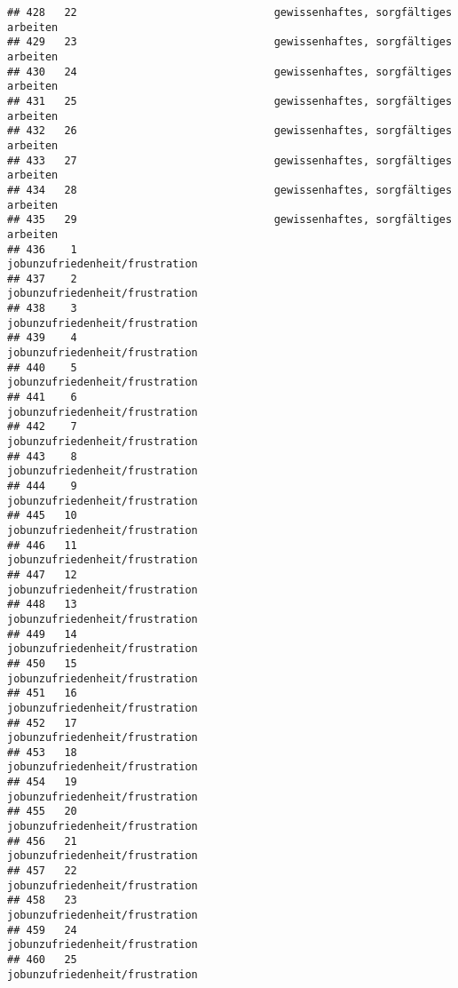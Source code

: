 \documentclass[
]{article}
\begin{document}
\begin{verbatim}
## 428   22                               gewissenhaftes, sorgfältiges arbeiten
## 429   23                               gewissenhaftes, sorgfältiges arbeiten
## 430   24                               gewissenhaftes, sorgfältiges arbeiten
## 431   25                               gewissenhaftes, sorgfältiges arbeiten
## 432   26                               gewissenhaftes, sorgfältiges arbeiten
## 433   27                               gewissenhaftes, sorgfältiges arbeiten
## 434   28                               gewissenhaftes, sorgfältiges arbeiten
## 435   29                               gewissenhaftes, sorgfältiges arbeiten
## 436    1                                     jobunzufriedenheit/frustration 
## 437    2                                     jobunzufriedenheit/frustration 
## 438    3                                     jobunzufriedenheit/frustration 
## 439    4                                     jobunzufriedenheit/frustration 
## 440    5                                     jobunzufriedenheit/frustration 
## 441    6                                     jobunzufriedenheit/frustration 
## 442    7                                     jobunzufriedenheit/frustration 
## 443    8                                     jobunzufriedenheit/frustration 
## 444    9                                     jobunzufriedenheit/frustration 
## 445   10                                     jobunzufriedenheit/frustration 
## 446   11                                     jobunzufriedenheit/frustration 
## 447   12                                     jobunzufriedenheit/frustration 
## 448   13                                     jobunzufriedenheit/frustration 
## 449   14                                     jobunzufriedenheit/frustration 
## 450   15                                     jobunzufriedenheit/frustration 
## 451   16                                     jobunzufriedenheit/frustration 
## 452   17                                     jobunzufriedenheit/frustration 
## 453   18                                     jobunzufriedenheit/frustration 
## 454   19                                     jobunzufriedenheit/frustration 
## 455   20                                     jobunzufriedenheit/frustration 
## 456   21                                     jobunzufriedenheit/frustration 
## 457   22                                     jobunzufriedenheit/frustration 
## 458   23                                     jobunzufriedenheit/frustration 
## 459   24                                     jobunzufriedenheit/frustration 
## 460   25                                     jobunzufriedenheit/frustration 

\end{verbatim}
\end{document}
